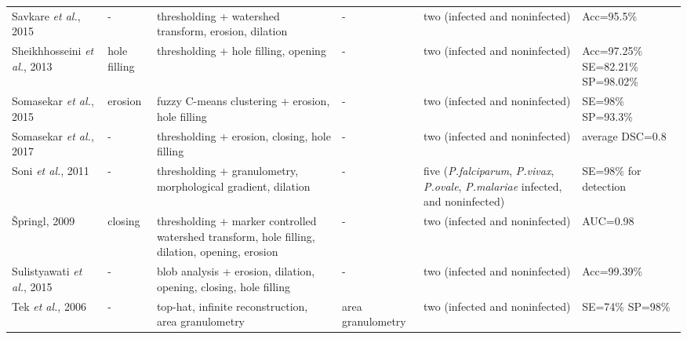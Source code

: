 \begin{longtable}{C{2.1cm} C{2.1cm} C{2.3cm} H C{2.7cm} C{2.2cm} }
    Savkare \emph{et al.}, 2015  &
    	- &
    	thresholding + watershed transform, erosion, dilation  &
    	- &
    	two (infected and noninfected) &
    	Acc=95.5\% \vspace{0.6cm} \\

    Sheikhhosseini \emph{et al.}, 2013  &
    	hole filling &
    	thresholding + hole filling, opening  &
    	- &
    	two (infected and noninfected) &
    	Acc=97.25\% SE=82.21\% SP=98.02\% \vspace{0.6cm} \\

    Somasekar \emph{et al.}, 2015  &
    	erosion &
    	fuzzy C-means clustering + erosion, hole filling  &
    	- &
    	two (infected and noninfected) &
    	SE=98\% SP=93.3\% \vspace{0.6cm} \\

    Somasekar \emph{et al.}, 2017  &
    	- &
    	thresholding + erosion, closing, hole filling  &
    	- &
    	two (infected and noninfected) &
    	average DSC=0.8 \vspace{0.6cm} \\

    Soni \emph{et al.}, 2011  &
    	- &
    	thresholding + granulometry, morphological gradient, dilation  &
    	- &
    	five (\emph{P.falciparum}, \emph{P.vivax}, \emph{P.ovale}, \emph{P.malariae} infected, and noninfected) &
    	SE=98\% for detection  \vspace{0.6cm} \\

{\v{S}}pringl, 2009  &
    	closing &
    	thresholding + marker controlled watershed transform, hole filling, dilation, opening, erosion  &
    	- &
    	two (infected and noninfected) &
    	AUC=0.98 \vspace{0.6cm} \\

    Sulistyawati \emph{et al.}, 2015  &
    	- &
    	blob analysis + erosion, dilation, opening, closing, hole filling  &
    	- &
    	two (infected and noninfected) &
    	Acc=99.39\% \vspace{0.6cm} \\

 Tek \emph{et al.}, 2006  &
    	- &
    	top-hat, infinite reconstruction, area granulometry  &
    	area granulometry &
    	two (infected and noninfected) &
    	SE=74\% SP=98\% \vspace{0.6cm} \\


\end{longtable}
